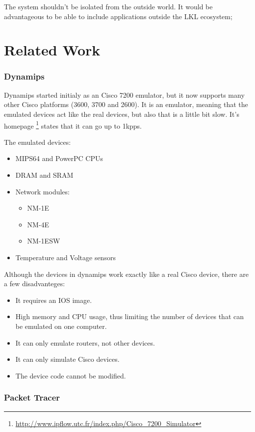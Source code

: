 The system shouldn't be isolated from the outside world. It would be advantageous to be able
to include applications outside the LKL ecosystem;

\section{Related Work}
\label{sec:proj-related}

\subsubsection{Dynamips}

Dynamips started initialy as an Cisco 7200 emulator, but it now supports many other
Cisco platforms (3600, 3700 and 2600). It is an emulator, meaning that the emulated
devices act like the real devices, but also that is a little bit slow. It's
homepage \footnote{\url{http://www.ipflow.utc.fr/index.php/Cisco_7200_Simulator}}
states that it can go up to 1kpps. 

The emulated devices:
\begin{itemize}
  \item MIPS64 and PowerPC CPUs
  \item DRAM and SRAM
  \item Network modules:
    \begin{itemize}
      \item NM-1E
      \item NM-4E
      \item NM-1ESW
    \end{itemize}
  \item Temperature and Voltage sensors
\end{itemize}

Although the devices in dynamips work exactly like a real Cisco device, there are a few disadvanteges:
\begin{itemize}
  \item It requires an IOS image.
  \item High memory and CPU usage, thus limiting the number of devices that can be emulated on one computer.
  \item It can only emulate routers, not other devices.
  \item It can only simulate Cisco devices.
  \item The device code cannot be modified.
\end{itemize}

\subsubsection{Packet Tracer}

